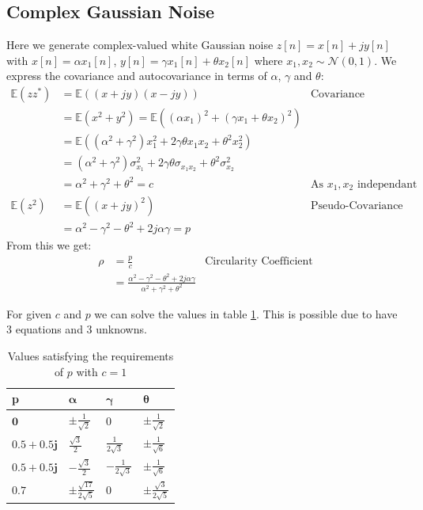 \documentclass[10pt,twoside,a4paper]{report}
\begin{document}
\subsection{Complex Gaussian Noise}
Here we generate complex-valued white Gaussian noise $z[n]=x[n]+jy[n]$ with $x[n]=\alpha x_1[n]$, $y[n]= \gamma x_1[n] + \theta x_2[n]$ where $x_1,x_2 \sim \mathcal{N}(0,1)$. We express the covariance and autocovariance in terms of $\alpha$, $\gamma$ and $\theta$:
\begin{align*}
\mathbb{E}(zz^*) &= \mathbb{E}\left((x+jy)(x-jy)\right) & \text{Covariance}\\
&= \mathbb{E}\left(x^2+y^2\right)= \mathbb{E}\left((\alpha x_1)^2+(\gamma x_1 + \theta x_2)^2\right) & \\
&= \mathbb{E}\left((\alpha^2 +\gamma^2)x_1^2 + 2\gamma \theta x_1 x_2 + \theta^2 x_2^2\right)\\
&=(\alpha^2 + \gamma^2)\sigma_{x_1}^2 + 2\gamma \theta \sigma_{x_1 x_2} + \theta^2 \sigma_{x_2}^2 & \\
&=\alpha^2 +\gamma^2  + \theta^2  =c&\text{As }x_1, x_2\text{ independant} \\
\mathbb{E}(z^2) &= \mathbb{E}\left((x+jy)^2\right) & \text{Pseudo-Covariance}\\
&= \alpha^2-\gamma^2-\theta^2+2j\alpha\gamma=p&
\end{align*}
From this we get:
\begin{align*}
\rho &= \frac{p}{c} & \text{Circularity Coefficient}\\
&= \frac{\alpha^2-\gamma^2-\theta^2+2j\alpha\gamma}{\alpha^2 +\gamma^2  + \theta^2}&
\end{align*}

For given $c$ and $p$ we can solve the values in table \ref{tab:complex_gaus}. This is possible due to have 3 equations and 3 unknowns.

\begin{table}[h]
\centering
\renewcommand{\arraystretch}{1.5}
\begin{tabular}{|l|l|l|l|}
\hline
\textbf{p}        & $\bm{\alpha}$ & $\bm{\gamma}$ & $\bm{\theta}$ \\ \hline
$\bm{0}$        & $\pm\frac{1}{\sqrt{2}}$ & $0$        & $\pm\frac{1}{\sqrt{2}}$        \\ \hline
$\bm{0.5+0.5j}$ & $\frac{\sqrt{3}}{2}$  & $\frac{1}{2\sqrt{3}}$ & $\pm\frac{1}{\sqrt{6}}$       \\ \hline
$\bm{0.5+0.5j}$ & $-\frac{\sqrt{3}}{2}$  & $-\frac{1}{2\sqrt{3}}$ & $\pm\frac{1}{\sqrt{6}}$       \\ \hline
$\bm{0.7}$      & $\pm\frac{\sqrt{17}}{2\sqrt{5}}$        & $0$        &    $\pm\frac{\sqrt{3}}{2\sqrt{5}}$      \\ \hline
\end{tabular}
\caption{Values satisfying the requirements of $p$ with $c=1$}
\label{tab:complex_gaus}
\end{table}
\end{document}
